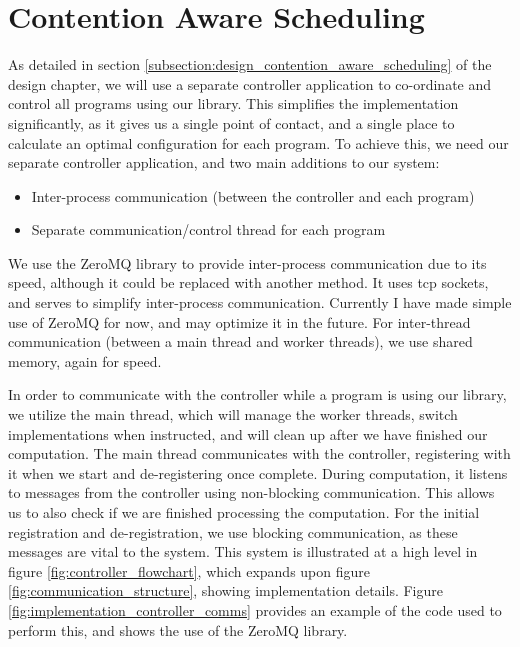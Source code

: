 \section{Contention Aware Scheduling}
\label{section:implementation_contention_aware_scheduling}

As detailed in section \ref{subsection:design_contention_aware_scheduling} of the design chapter, we will use a separate controller application to co-ordinate and control all programs using our library. This simplifies the implementation significantly, as it gives us a single point of contact, and a single place to calculate an optimal configuration for each program. To achieve this, we need our separate controller application, and two main additions to our system:

\begin{itemize}
	\item Inter-process communication (between the controller and each program)
	\item Separate communication/control thread for each program
\end{itemize}

We use the ZeroMQ library to provide inter-process communication due to its speed, although it could be replaced with another method. It uses tcp sockets, and serves to simplify inter-process communication. Currently I have made simple use of ZeroMQ for now, and may optimize it in the future. For inter-thread communication (between a main thread and worker threads), we use shared memory, again for speed.

In order to communicate with the controller while a program is using our library, we utilize the main thread, which will manage the worker threads, switch implementations when instructed, and will clean up after we have finished our computation. The main thread communicates with the controller, registering with it when we start and de-registering once complete. During computation, it listens to messages from the controller using non-blocking communication. This allows us to also check if we are finished processing the computation. For the initial registration and de-registration, we use blocking communication, as these messages are vital to the system. This system is illustrated at a high level in figure \ref{fig:controller_flowchart}, which expands upon figure \ref{fig:communication_structure}, showing implementation details. Figure \ref{fig:implementation_controller_comms} provides an example of the code used to perform this, and shows the use of the ZeroMQ library.



